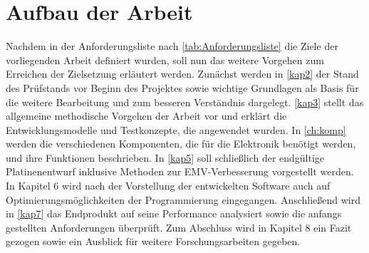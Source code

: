 \section{Aufbau der Arbeit}
Nachdem in der Anforderungsliste nach \autoref{tab:Anforderungsliste} die Ziele der vorliegenden Arbeit definiert wurden, soll nun das weitere Vorgehen zum Erreichen der Zielsetzung erläutert werden. Zunächst werden in \autoref{kap2} der Stand des Prüfstands vor Beginn des Projektes sowie wichtige Grundlagen als Basis für die weitere Bearbeitung und zum besseren Verständnis dargelegt. \autoref{kap3} stellt das allgemeine methodische Vorgehen der Arbeit vor und erklärt die Entwicklungsmodelle und Testkonzepte, die angewendet wurden.
In \autoref{ch:komp} werden die verschiedenen Komponenten, die für die Elektronik benötigt werden, und ihre Funktionen beschrieben.  
In \autoref{kap5} soll schließlich der endgültige Platinenentwurf inklusive Methoden zur EMV-Verbesserung vorgestellt werden.
In Kapitel 6 wird nach der Vorstellung der entwickelten Software auch auf Optimierungsmöglichkeiten der Programmierung eingegangen.
Anschließend wird in \autoref{kap7} das Endprodukt auf seine Performance analysiert sowie die anfangs gestellten Anforderungen überprüft. Zum Abschluss wird in Kapitel 8 ein Fazit gezogen sowie ein Ausblick für weitere Forschungsarbeiten gegeben.